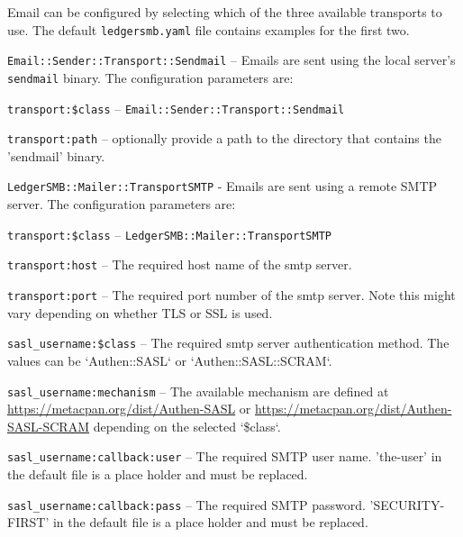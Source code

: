 Email  can be configured by selecting which of the three available transports to use. The default \texttt{ledgersmb.yaml} file contains examples for the first two.

\begin{description}
    
    \item{\texttt{Email::Sender::Transport::Sendmail}} – Emails are sent using the local server's \texttt{sendmail}  binary. The configuration parameters are:
    \begin{description}
        \item{\texttt{transport:\$class}} – \texttt{Email::Sender::Transport::Sendmail}
        \item{\texttt{transport:path}} – optionally provide a path to the directory that contains the 'sendmail' binary.
    \end{description}
    
    \item{\texttt{LedgerSMB::Mailer::TransportSMTP}} - Emails  are sent using a remote SMTP  server.  The configuration parameters are:
    \begin{description}
        \item{\texttt{transport:\$class}} – \texttt{LedgerSMB::Mailer::TransportSMTP}
        \item {\texttt{transport:host}} – The required host name of the smtp  server.
        \item {\texttt{transport:port}} – The required port number of the smtp server. Note this might vary depending on whether TLS or SSL is used.
        \item {\texttt{sasl\_username:\$class}} – The required smtp server authentication method. The values can be `Authen::SASL` or `Authen::SASL::SCRAM`.
        \item {\texttt{sasl\_username:mechanism}} –  The available mechanism are defined at \url{https://metacpan.org/dist/Authen-SASL} or \url{ https://metacpan.org/dist/Authen-SASL-SCRAM} depending on the selected `\$class`.
        \item {\texttt{sasl\_username:callback:user}} – The required SMTP user name.   'the-user' in the default file is a place holder and must be replaced.
        \item {\texttt{sasl\_username:callback:pass}} – The required SMTP password.  'SECURITY-FIRST' in the default file is a place holder and must be replaced.
    \end{description}
    

\end{description}

